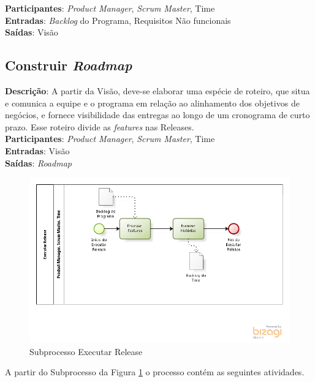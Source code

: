   \textbf{Participantes}: \textit{Product Manager}, \textit{Scrum Master}, Time \\
  
  \textbf{Entradas}: \textit{Backlog} do Programa, Requisitos Não funcionais \\
  
  \textbf{Saídas}:  Visão\\
  
\subsection{Construir \textit{Roadmap}}
  \textbf{Descrição}: A partir da Visão, deve-se elaborar uma espécie de roteiro, que situa e comunica a equipe e o programa em relação ao 
  alinhamento dos objetivos de negócios, e fornece visibilidade das entregas ao longo de um cronograma de curto prazo. 
  Esse roteiro divide as \textit{features} nas Releases. \\
  
  \textbf{Participantes}: \textit{Product Manager}, \textit{Scrum Master}, Time \\
  
  \textbf{Entradas}: Visão \\
  
  \textbf{Saídas}:  \textit{Roadmap}\\

\begin{figure}[!htb]
\centering
\includegraphics[scale=0.7]{figuras/release.png}
\caption{Subprocesso Executar Release}
\label{fig:release}
\end{figure}
  
A partir do Subprocesso da Figura \ref{fig:release} o processo contém as seguintes atividades.

